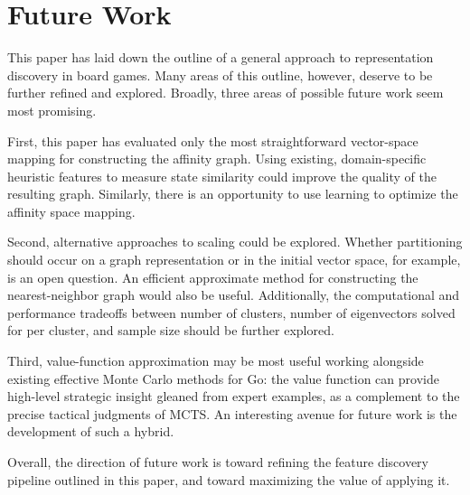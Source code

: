 \section{Future Work}

This paper has laid down the outline of a general approach to representation
discovery in board games. Many areas of this outline, however, deserve to be
further refined and explored. Broadly, three areas of possible future work seem
most promising.

First, this paper has evaluated only the most straightforward vector-space
mapping for constructing the affinity graph. Using existing, domain-specific
heuristic features to measure state similarity could improve the quality of
the resulting graph. Similarly, there is an opportunity to use learning to 
optimize the affinity space mapping.

Second, alternative approaches to scaling could be explored. Whether
partitioning should occur on a graph representation or in the initial vector
space, for example, is an open question. An efficient approximate method for
constructing the nearest-neighbor graph would also be useful. Additionally, the
computational and performance tradeoffs between number of clusters, number of
eigenvectors solved for per cluster, and sample size should be further
explored.

Third, value-function approximation may be most useful working alongside
existing effective Monte Carlo methods for Go: the value function can provide
high-level strategic insight gleaned from expert examples, as a complement to
the precise tactical judgments of MCTS. An interesting avenue for future work
is the development of such a hybrid.

Overall, the direction of future work is toward refining the feature discovery
pipeline outlined in this paper, and toward maximizing the value of applying
it. 

